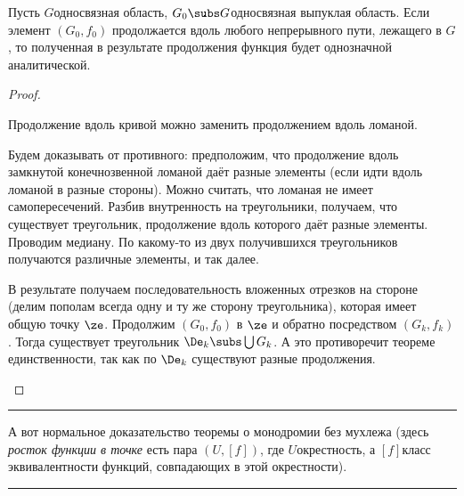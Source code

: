 \documentclass[a4paper]{article}
\newenvironment{petit}
{\par \smallskip \hrule \smallskip \footnotesize}
{\par \smallskip \hrule \smallskip}
\begin{document}
\begin{theorem}
\begin{theorem}[О монодромии]
Пусть $G$\т односвязная область, $G_0\subs G$\т односвязная выпуклая область. Если элемент  $(G_0,f_0)$
продолжается вдоль любого непрерывного пути, лежащего в $G$, то полученная в результате продолжения
функция будет однозначной аналитической.
\end{theorem}
\begin{proof}
\begin{points}{-1}
\item Продолжение вдоль кривой можно заменить продолжением вдоль ломаной.
\item Будем доказывать от противного: предположим,  что продолжение вдоль замкнутой конечнозвенной ломаной
даёт разные элементы (если идти вдоль ломаной в разные стороны). Можно считать, что ломаная не имеет
самопересечений. Разбив внутренность на треугольники, получаем, что существует треугольник,  продолжение
вдоль которого даёт разные элементы. Проводим медиану. По какому-то из двух получившихся треугольников получаются
различные элементы, и так далее.
\item В результате получаем последовательность вложенных отрезков на стороне (делим пополам всегда одну и
ту же сторону треугольника),  которая имеет общую точку $\ze$. Продолжим $(G_0,f_0)$ в $\ze$ и обратно
посредством $(G_k,f_k)$. Тогда существует треугольник $\De_k \subs \bigcup G_k$. А это противоречит
теореме единственности, так как по $\De_k$ существуют разные продолжения.
\end{points}
\hfill\end{proof}

\begin{petit}
А вот нормальное доказательство теоремы о монодромии без мухлежа (здесь \emph{росток функции в точке} есть пара $(U,[f])$,
где $U$\т окрестность, а $[f]$\т класс эквивалентности функций, совпадающих в этой окрестности).


\end{petit}
\end{theorem}
\end{document}
